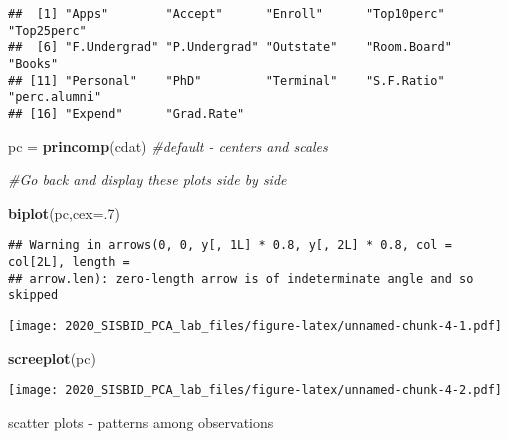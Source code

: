 \documentclass[
]{article}
\newenvironment{Shaded}{\begin{snugshade}}{\end{snugshade}}
\newcommand{\CommentTok}[1]{\textcolor[rgb]{0.56,0.35,0.01}{\textit{#1}}}
\newcommand{\DataTypeTok}[1]{\textcolor[rgb]{0.13,0.29,0.53}{#1}}
\newcommand{\DecValTok}[1]{\textcolor[rgb]{0.00,0.00,0.81}{#1}}
\newcommand{\KeywordTok}[1]{\textcolor[rgb]{0.13,0.29,0.53}{\textbf{#1}}}
\newcommand{\NormalTok}[1]{#1}
\newcommand{\OperatorTok}[1]{\textcolor[rgb]{0.81,0.36,0.00}{\textbf{#1}}}
\newcommand{\StringTok}[1]{\textcolor[rgb]{0.31,0.60,0.02}{#1}}
\begin{document}
\begin{verbatim}
##  [1] "Apps"        "Accept"      "Enroll"      "Top10perc"   "Top25perc"  
##  [6] "F.Undergrad" "P.Undergrad" "Outstate"    "Room.Board"  "Books"      
## [11] "Personal"    "PhD"         "Terminal"    "S.F.Ratio"   "perc.alumni"
## [16] "Expend"      "Grad.Rate"
\end{verbatim}

\begin{Shaded}
\begin{Highlighting}[]
\NormalTok{pc =}\StringTok{ }\KeywordTok{princomp}\NormalTok{(cdat) }\CommentTok{#default - centers and scales}

\CommentTok{#Go back and display these plots side by side}

\KeywordTok{biplot}\NormalTok{(pc,}\DataTypeTok{cex=}\NormalTok{.}\DecValTok{7}\NormalTok{)}
\end{Highlighting}
\end{Shaded}

\begin{verbatim}
## Warning in arrows(0, 0, y[, 1L] * 0.8, y[, 2L] * 0.8, col = col[2L], length =
## arrow.len): zero-length arrow is of indeterminate angle and so skipped
\end{verbatim}

\texttt{[image: 2020\_SISBID\_PCA\_lab\_files/figure-latex/unnamed-chunk-4-1.pdf]}

\begin{Shaded}
\begin{Highlighting}[]
\KeywordTok{screeplot}\NormalTok{(pc)}
\end{Highlighting}
\end{Shaded}

\texttt{[image: 2020\_SISBID\_PCA\_lab\_files/figure-latex/unnamed-chunk-4-2.pdf]}

scatter plots - patterns among observations

\begin{Shaded}
\end{Shaded}
\end{document}
